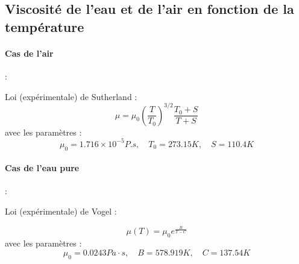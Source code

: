 \subsection{Viscosité de l'eau et de l'air en fonction de la température}

\paragraph{Cas de l'air} :

Loi (expérimentale) de Sutherland : 
$$
\mu = \mu_0 \left( \frac{T}{T_0} \right)^{3/2} \frac{ T_0 + S }{T+S} 
$$
avec les paramètres :
$$
\mu_0 = 	1.716 \times 10^{-5} P.s,  \quad T_0 = 273.15 K , \quad S = 110.4 K
$$

\paragraph{Cas de l'eau pure} :

Loi (expérimentale)  de Vogel :

$$
\mu(T)  = \mu_0 e^{\frac{B}{T-C}}
$$
avec les paramètres : 
$$ 
\mu_0 = 0.0243 Pa\cdot s, \quad B = 578.919 K, \quad C = 137.54 K
$$
 



